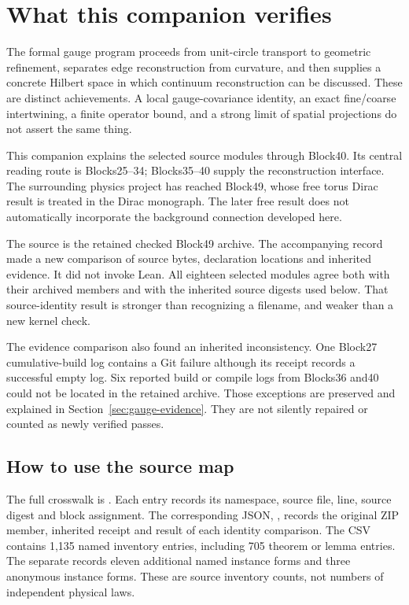 \section{What this companion verifies}

The formal gauge program proceeds from unit-circle transport to geometric refinement, separates edge reconstruction from curvature, and then supplies a concrete Hilbert space in which continuum reconstruction can be discussed. These are distinct achievements. A local gauge-covariance identity, an exact fine/coarse intertwining, a finite operator bound, and a strong limit of spatial projections do not assert the same thing.

This companion explains the selected source modules through Block40. Its central reading route is Blocks25--34; Blocks35--40 supply the reconstruction interface. The surrounding physics project has reached Block49, whose free torus Dirac result is treated in the Dirac monograph. The later free result does not automatically incorporate the background connection developed here.

The source is the retained checked Block49 archive. The accompanying record made a new comparison of source bytes, declaration locations and inherited evidence. It did not invoke Lean. All eighteen selected modules agree both with their archived members and with the inherited source digests used below. That source-identity result is stronger than recognizing a filename, and weaker than a new kernel check.

The evidence comparison also found an inherited inconsistency. One Block27 cumulative-build log contains a Git failure although its receipt records a successful empty log. Six reported build or compile logs from Blocks36 and40 could not be located in the retained archive. Those exceptions are preserved and explained in Section~\ref{sec:gauge-evidence}. They are not silently repaired or counted as newly verified passes.

\subsection{How to use the source map}

The full crosswalk is . Each entry records its namespace, source file, line, source digest and block assignment. The corresponding JSON, , records the original ZIP member, inherited receipt and result of each identity comparison. The CSV contains 1,135 named inventory entries, including 705 theorem or lemma entries. The separate  records eleven additional named instance forms and three anonymous instance forms. These are source inventory counts, not numbers of independent physical laws.

